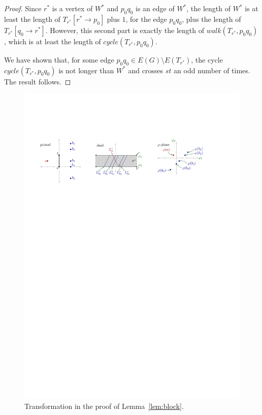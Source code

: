 \documentclass[a4paper,USenglish]{lipics}
\newcommand{\cycle}{\mathit{cycle}}
\newcommand{\walk}{\mathit{walk}}
\begin{document}
\begin{appendix}
\begin{proof}
	Since $r^*$ is a vertex of $W^*$ and $p_0q_0$ is an edge of $W^*$,
	the length of $W^*$ is at least the length of $T_{r^*}[r^* \rightarrow p_0]$ plus $1$,
	for the edge $p_0q_0$,
	plus the length of $T_{r^*}[q_0 \rightarrow r^*]$. However, this second part
	is exactly the length of $\walk(T_{r^*},p_0q_0)$, which is at least the length of 
	$\cycle(T_{r^*},p_0q_0)$.

	We have shown that, for some edge $p_0q_0\in E(G)\setminus E(T_{r^*})$,
	the cycle $\cycle(T_{r^*},p_0q_0)$ is not longer than $W^*$ 
	and crosses $st$ an odd number of times. The result follows.
\end{proof}


\begin{figure}[htb]
	\centering
	\includegraphics[width=\textwidth]{duality}
	\caption{Transformation in the proof of Lemma~\ref{lem:block}.}
	\label{fig:duality}
\end{figure}


\end{appendix}
\end{document}
